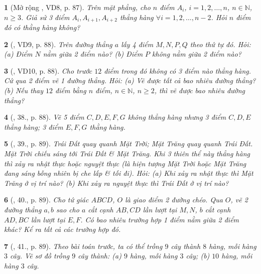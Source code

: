 \documentclass{article}
\newtheorem{baitoan}{}
\begin{document}
\begin{baitoan}[Mở rộng \cite{Tuyen_Toan_6}, VD8, p. 87]
	Trên mặt phẳng, cho $n$ điểm $A_i$, $i = 1,2,\ldots,n$, $n\in\mathbb{N}$, $n\ge3$. Giả sử 3 điểm $A_i,A_{i+1},A_{i+2}$ thẳng hàng $\forall i = 1,2,\ldots,n-2$. Hỏi $n$ điểm đó có thằng hàng không?
\end{baitoan}

\begin{baitoan}[\cite{Tuyen_Toan_6}, VD9, p. 88]
	Trên đường thẳng $a$ lấy 4 điểm $M,N,P,Q$ theo thứ tự đó. Hỏi: (a) Điểm $N$ nằm giữa 2 điểm nào? (b) Điểm $P$ không nằm giữa 2 điểm nào?
\end{baitoan}

\begin{baitoan}[\cite{Tuyen_Toan_6}, VD10, p. 88]
	Cho trước $12$ điểm trong đó không có 3 điểm nào thẳng hàng. Cứ qua 2 điểm vẽ 1 đường thẳng. Hỏi: (a) Vẽ được tất cả bao nhiêu đường thẳng? (b) Nếu thay $12$ điểm bằng $n$ điểm, $n\in\mathbb{N}$, $n\ge2$, thì vẽ được bao nhiêu đường thẳng?
\end{baitoan}

\begin{baitoan}[\cite{Tuyen_Toan_6}, 38., p. 88]
	Vẽ 5 điểm $C,D,E,F,G$ không thẳng hàng nhưng 3 điểm $C,D,E$ thẳng hàng; 3 điểm $E,F,G$ thằng hàng.
\end{baitoan}

\begin{baitoan}[\cite{Tuyen_Toan_6}, 39., p. 89]
	Trái Đất quay quanh Mặt Trời; Mặt Trăng quay quanh Trái Đất. Mặt Trời chiếu sáng tới Trái Đất \& Mặt Trăng. Khi 3 thiên thể này thẳng hàng thì xảy ra nhật thực hoặc nguyệt thực (là hiện tượng Mặt Trời hoặc Mặt Trăng đang sáng bỗng nhiên bị che lấp \& tối đi). Hỏi: (a) Khi xảy ra nhật thực thì Mặt Trăng ở vị trí nào? (b) Khi xảy ra nguyệt thực thì Trái Đất ở vị trí nào?
\end{baitoan}

\begin{baitoan}[\cite{Tuyen_Toan_6}, 40., p. 89]
	Cho tứ giác $ABCD$, $O$ là giao điểm 2 đường chéo. Qua $O$, vẽ 2 đường thẳng $a,b$ sao cho $a$ cắt cạnh $AB,CD$ lần lượt tại $M,N$, $b$ cắt cạnh $AD,BC$ lần lượt tại $E,F$. Có bao nhiêu trường hợp 1 điểm nằm giữa 2 điểm khác? Kể ra tất cả các trường hợp đó.
\end{baitoan}

\begin{baitoan}[\cite{Tuyen_Toan_6}, 41., p. 89]
	Theo bài toán trước, ta có thể trồng $9$ cây thành $8$ hàng, mỗi hàng $3$ cây. Vẽ sơ đồ trồng $9$ cây thành: (a) $9$ hàng, mỗi hàng $3$ cây; (b) $10$ hàng, mỗi hàng $3$ cây.
\end{baitoan}
\end{document}
